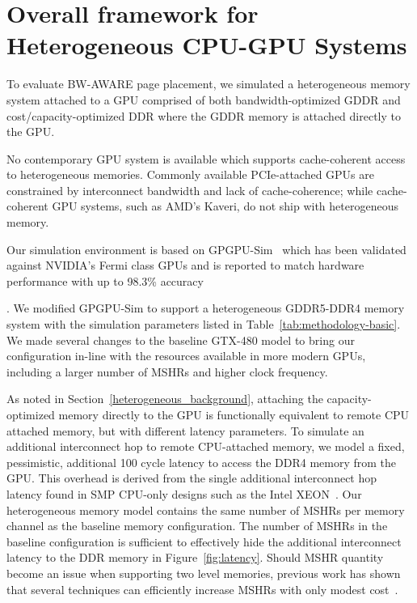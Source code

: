 \section{Overall framework for Heterogeneous CPU-GPU Systems}
To evaluate BW-AWARE page placement, we simulated a heterogeneous memory system
attached to a GPU comprised of both bandwidth-optimized GDDR and
cost/capacity-optimized DDR where the GDDR memory is attached directly to the
GPU\@.  {\color{black} No contemporary GPU system is available which supports
cache-coherent access to heterogeneous memories.  Commonly available
PCIe-attached GPUs are constrained by interconnect bandwidth and lack of
cache-coherence; while cache-coherent GPU systems, such as AMD's Kaveri, do not
ship with heterogeneous memory. 

Our simulation environment is based on GPGPU-Sim~\cite{gpgpusimIspass09} which
has been validated against NVIDIA's Fermi class GPUs and is reported to match
hardware performance with up to 98.3\% accuracy~\cite{gpgpusimManual}}.  We
modified GPGPU-Sim to support a heterogeneous GDDR5-DDR4 memory system with the
simulation parameters listed in Table~\ref{tab:methodology-basic}.  We made several
changes to the baseline GTX-480 model to bring our configuration in-line with
the resources available in more modern GPUs, including a larger number of MSHRs
and higher clock frequency.

As noted in Section~\ref{heterogeneous_background}, attaching the
capacity-optimized memory directly to the GPU is functionally equivalent to
remote CPU attached memory, but with different latency parameters.  To simulate
an additional interconnect hop to remote CPU-attached memory, we model a fixed,
pessimistic, additional 100 cycle latency to access the DDR4 memory from the
GPU\@. This overhead is derived from the single additional interconnect hop
latency found in SMP CPU-only designs such as the Intel XEON~\cite{INTELXEON}\@.
Our heterogeneous memory model contains the same number of MSHRs per memory
channel as the baseline memory configuration.  The number of MSHRs in the
baseline configuration is sufficient to effectively hide the additional
interconnect latency to the DDR memory in Figure~\ref{fig:latency}. Should MSHR
quantity become an issue when supporting two level memories, previous work has
shown that several techniques can efficiently increase MSHRs with only modest
cost~\cite{ref:tuck:scalablemisshandling, ref:minikin:prefetch}.


